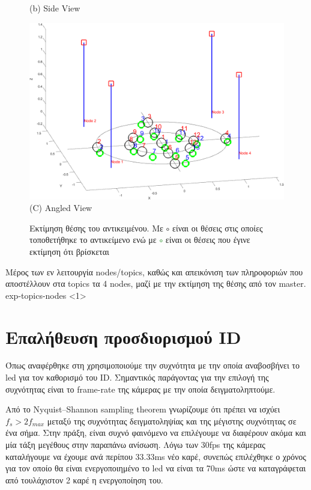 \begin{figure} [H]
\begin{minipage}{.5\textwidth}
      {(b) Side View}
	  \end{minipage}
  \begin{minipage}{\textwidth}
    \centering
    \includegraphics[width=.8\linewidth]{../Images/Experiments-Results/nodes-pos-with-est-angle.png}\\
    {(C) Angled View}
  \end{minipage}
    \hfill \break
    \decoRule
    \caption[Εκτίμηση θέσης του αντικειμένου.]{Εκτίμηση θέσης του αντικειμένου. Με \textcolor{black}{\LARGE$\circ$} είναι οι θέσεις στις οποίες τοποθετήθηκε το αντικείμενο ενώ με \textcolor{green}{\LARGE$\circ$} είναι οι θέσεις που έγινε εκτίμηση ότι βρίσκεται} %
    \label{fig:multi-exp-pos-estimations}
\end{figure}

{Μέρος των εν λειτουργία nodes/topics, καθώς και απεικόνιση των πληροφοριών που αποστέλλουν στα topics τα 4 nodes, μαζί με την εκτίμηση της θέσης από τον master.}%
{exp-topics-nodes}%
<1>


\section{Επαλήθευση προσδιορισμού ID}
Όπως αναφέρθηκε στη  χρησιμοποιούμε την συχνότητα με την οποία αναβοσβήνει το led για τον καθορισμό του ID. Σημαντικός παράγοντας για την επιλογή της συχνότητας είναι το frame-rate της κάμερας με την οποία δειγματοληπτούμε. 

Από το Nyquist–Shannon sampling theorem γνωρίζουμε ότι πρέπει να ισχύει $f_s > 2f_{max}$ μεταξύ της συχνότητας δειγματοληψίας και της μέγιστης συχνότητας σε ένα σήμα. Στην πράξη, είναι συχνό φαινόμενο να επιλέγουμε να διαφέρουν ακόμα και μία τάξη μεγέθους στην παραπάνω ανίσωση. Λόγω των 30fps της κάμερας καταλήγουμε να έχουμε ανά περίπου 33.33ms νέο καρέ, συνεπώς επιλέχθηκε ο χρόνος για τον οποίο θα είναι ενεργοποιημένο το led να είναι τα 70ms ώστε να καταγράφεται από τουλάχιστον 2 καρέ η ενεργοποίηση του. 

